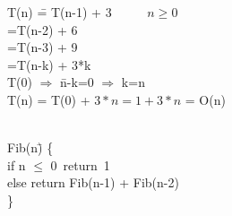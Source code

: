 \documentclass{article}
\begin{document}
{\begin{figure}[ht]
\begin{center}
\begin{tabbing}
\indent T(n) \== T(n-1) + 3 \ \ \ \ \ $n \geq 0$ \\
\indent \>=T(n-2) + 6 \\
\indent \>=T(n-3) + 9 \\
\indent \>=T(n-k) + 3*k \\

\indent T(0) $\Rightarrow$ \=n-k=0 $\Rightarrow$ k=n \\
\indent \>T(n) = T(0) + $3*n = 1+3*n$ = O(n)\\


\end{tabbing}
\label{fig_alg_ex}
\end{center}
\end{figure}

\begin{figure}[ht]
\begin{center}
\begin{tabbing}
 \\
\indent Fib(n\=) \{ \\
\indent \>if n $\leq$ 0\ return\ 1 \\
\indent \>else return Fib(n-1) + Fib(n-2) \hspace{1.9cm}{\it O(1)}\\
\indent \} \\
\indent \\
\indent \\


\end{tabbing}
\label{fig_alg_ex}
\end{center}
\end{figure}

\begin{figure}[ht]
\begin{center}
\begin{tabbing}


\end{tabbing}
\end{center}
\end{figure}}
\end{document}
